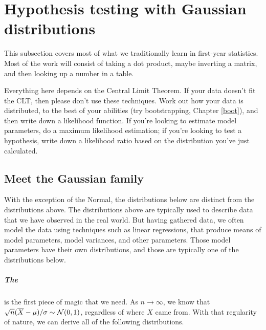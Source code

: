 \chapter[Gaussian tricks]{Hypothesis testing with Gaussian distributions} \label{gauss}

This subsection covers most of what we traditionally learn in first-year statistics. 
 Most of the work will consist of taking a dot product, maybe inverting a matrix,
and then looking up a number in a table. 

Everything here depends on the Central Limit Theorem. If your data doesn't
fit the CLT, then please don't use these techniques. Work out how your
data is distributed, to the best of your abilities (try bootstrapping,
Chapter \ref{boot}), and then write down a likelihood function. If you're
looking to estimate model parameters, do a maximum likelihood estimation;
if you're looking to test a hypothesis, write down a likelihood ratio
based on the distribution you've just calculated.



\section{Meet the Gaussian family} \label{dist2}
With the exception of the Normal, the distributions below are distinct
from the distributions above. The distributions above are typically used
to describe data that we have observed in the real world. But having
gathered data, we often model the data using techniques such as
linear regressions, that produce means of model parameters, model
variances, and other parameters. Those model parameters have their own
distributions, and those are typically one of the distributions below.


\paragraph{The } is the first piece of magic
that we need. As $n\to \infty$, we know that $\sqrt{n} (\overline X -
\mu)/\sigma \sim {\cal N}(0,1)$, regardless of where $X$ came
from. With that regularity of nature, we can derive all of the following distributions.
\label{CLT}

